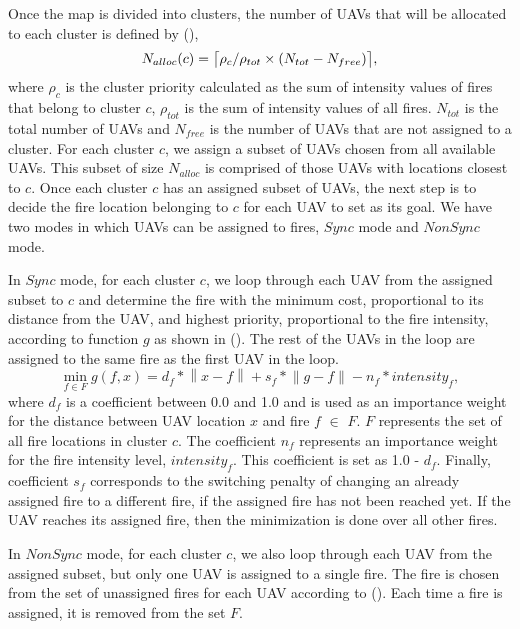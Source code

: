 \documentclass[a4paper, 11pt]{article}
\DeclarePairedDelimiter{\ceil}{\lceil}{\rceil}
\newcommand{\norm}[1]{\left\lVert#1\right\rVert}
\begin{document}
Once the map is divided into clusters, the number of UAVs that will be allocated to each cluster is defined by (),
\begin{equation}
N_{alloc}(c) = \ceil[\big]{\rho_{c}/\rho_{tot}\times(N_{tot} - N_{free})},
\end{equation}
where $\rho_{c}$ is the cluster priority calculated as the sum of intensity values of fires that belong to cluster $c$, $\rho_{tot}$ is the sum of intensity values of all fires. $N_{tot}$ is the total number of UAVs and $N_{free}$ is the number of UAVs that are not assigned to a cluster. For each cluster $c$, we assign a subset of UAVs chosen from all available UAVs. This subset of size $N_{alloc}$ is comprised of those UAVs with locations closest to $c$. Once each cluster $c$ has an assigned subset of UAVs, the next step is to decide the fire location belonging to $c$ for each UAV to set as its goal. We have two modes in which UAVs can be assigned to fires, $Sync$ mode and $NonSync$ mode. 

In $Sync$  mode, for each cluster $c$, we loop through each UAV from the assigned subset to $c$ and determine the fire with the minimum cost, proportional to its distance from the UAV, and highest priority, proportional to the fire intensity, according to function $g$ as shown in (). The rest of the UAVs in the loop are assigned to the same fire as the first UAV in the loop.
\begin{equation}
\min_{f\in F} g(f,x) = d_{f}*\norm{x-f} + s_{f}*\norm{g-f} - n_{f}*intensity_{f},
\end{equation}
where $d_{f}$ is a coefficient between 0.0 and 1.0 and is used as an importance weight for the distance between UAV location $x$ and fire $f$ $\in$ $F$. $F$ represents the set of all fire locations in cluster $c$. The coefficient $n_{f}$ represents an importance weight for the fire intensity level, $intensity_{f}$. This coefficient is set as 1.0 - $d_{f}$. Finally, coefficient $s_{f}$ corresponds to the switching penalty of changing an already assigned fire to a different fire, if the assigned fire has not been reached yet. If the UAV reaches its assigned fire, then the minimization is done over all other fires.  

In $NonSync$ mode, for each cluster $c$, we also loop through each UAV from the assigned subset, but only one UAV is assigned to a single fire. The fire is chosen from the set of unassigned fires for each UAV according to (). Each time a fire is assigned, it is removed from the set $F$. 
\end{document}
